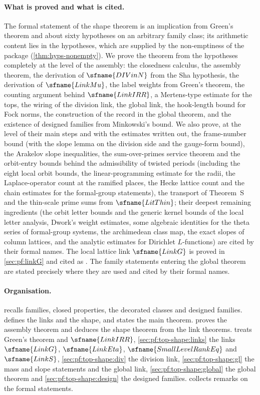 \paragraph{What is proved and what is cited.}
The formal statement of the shape theorem is an implication from Green's theorem and about sixty hypotheses
on an arbitrary family class; its arithmetic content lies in the hypotheses, which are supplied by the
non-emptiness of the package (\cref{thm:hyps-nonempty}). We prove the theorem from the hypotheses completely at
the level of the assembly: the closedness calculus, the assembly theorem, the derivation of $\sfname{DIVinN}$
from the Sha hypothesis, the derivation of $\sfname{LinkMu}$, the label weights from Green's theorem, the
counting argument behind $\sfname{LinkIRR}$, a Mertens-type estimate for the tops, the wiring of the division
link, the global link, the hook-length bound for Fock norms, the construction of the record in the global
theorem, and the existence of designed families from Minkowski's bound. We also prove, at the level of their main
steps and with the estimates written out, the frame-number bound (with the slope lemma on the division side and the
gauge-form bound), the Arakelov slope inequalities, the sum-over-primes service theorem and the orbit-entry bounds
behind the admissibility of twisted periods (including the eight local orbit bounds, the linear-programming estimate for
the radii, the Laplace-operator count at the ramified places, the Hecke lattice count and the chain estimates for the
formal-group statements), the transport of Theorem~S and the thin-scale prime sums from $\sfname{LitThin}$; their
deepest remaining ingredients (the orbit letter bounds and the generic kernel bounds of the local letter analysis,
Dwork's weight estimates, some algebraic identities for the theta series of formal-group systems, the archimedean class
map, the exact slopes of column lattices, and the analytic estimates for Dirichlet $L$-functions) are cited by their
formal names. The local lattice link $\sfname{LinkG}$
is proved in \cref{sec:pf:linkG} and cited as . The family statements
entering the global theorem are stated precisely where they are used and cited by their formal names.

\paragraph{Organisation.}
 recalls families, closed properties, the decorated classes and designed
families.  defines the links and the shape, and states the main theorem.
 proves the assembly theorem and deduces the shape theorem from the link
theorems.  treats Green's theorem and $\sfname{LinkIRR}$,
\cref{sec:pf:top-shape:links} the links $\sfname{LinkG}$, $\sfname{LinkEta}$, $\sfname{SmallLevelRankEq}$ and
$\sfname{LinkS}$, \cref{sec:pf:top-shape:div} the division link, \cref{sec:pf:top-shape:gl} the mass and slope
statements and the global link, \cref{sec:pf:top-shape:global} the global theorem and
\cref{sec:pf:top-shape:design} the designed families.  collects remarks on the
formal statements.

